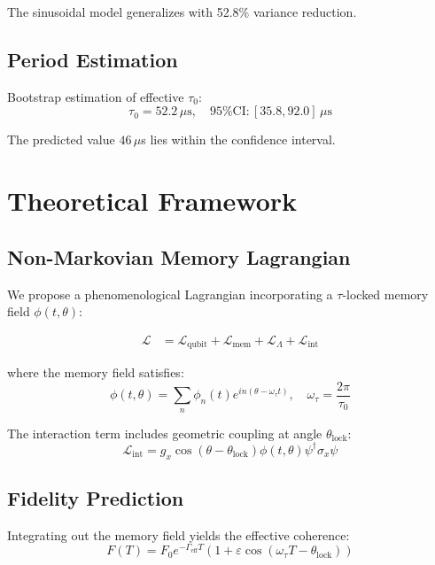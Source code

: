\documentclass[twocolumn,prl,superscriptaddress,floatfix]{revtex4-2}
\begin{document}
The sinusoidal model generalizes with 52.8\% variance reduction.

\subsection{Period Estimation}

Bootstrap estimation of effective $\tau_0$:
\begin{equation}
\tau_0 = 52.2\,\mu\text{s}, \quad \text{95\% CI}: [35.8, 92.0]\,\mu\text{s}
\end{equation}

The predicted value $46\,\mu$s lies within the confidence interval.

\section{Theoretical Framework}

\subsection{Non-Markovian Memory Lagrangian}

We propose a phenomenological Lagrangian incorporating a $\tau$-locked memory field $\phi(t,\theta)$:

\begin{align}
\mathcal{L} &= \mathcal{L}_{\text{qubit}} + \mathcal{L}_{\text{mem}} + \mathcal{L}_{\Lambda} + \mathcal{L}_{\text{int}}
\end{align}

where the memory field satisfies:
\begin{equation}
\phi(t,\theta) = \sum_n \phi_n(t) e^{in(\theta - \omega_\tau t)}, \quad \omega_\tau = \frac{2\pi}{\tau_0}
\end{equation}

The interaction term includes geometric coupling at angle $\theta_{\text{lock}}$:
\begin{equation}
\mathcal{L}_{\text{int}} = g_x \cos(\theta - \theta_{\text{lock}}) \phi(t,\theta) \psi^\dagger \sigma_x \psi
\end{equation}

\subsection{Fidelity Prediction}

Integrating out the memory field yields the effective coherence:
\begin{equation}
\boxed{F(T) = F_0 e^{-\Gamma_{\text{eff}} T} \left(1 + \varepsilon \cos(\omega_\tau T - \theta_{\text{lock}})\right)}
\end{equation}
\end{document}
